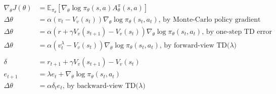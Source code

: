\begin{align*}
    \nabla_\theta J(\theta) & = \mathbb{E}_{{\pi_\theta}}[\nabla_\theta \log \pi_\theta(s, a) A^\pi_\theta(s, a)]                               \\
    \Delta \theta           & = \alpha(v_t - V_v(s_t))\nabla_\theta \log \pi_\theta(s_t, a_t) \text{, by Monte-Carlo policy gradient}           \\
    \Delta \theta           & = \alpha(r + \gamma V_v(s_{t+1}) - V_v(s_t))\nabla_\theta \log \pi_\theta(s_t, a_t) \text{, by one-step TD error} \\
    \Delta \theta           & = \alpha(v_t^\lambda - V_v(s_t))\nabla_\theta \log \pi_\theta(s_t, a_t) \text{, by forward-view TD($\lambda$)}    \\
    \\
    \delta                  & = r_{t+1} + \gamma V_v(s_{t+1}) - V_v(s_t)                                                                        \\
    e_{t+1}                 & = \lambda e_t + \nabla_\theta \log \pi_\theta(s_t, a_t)                                                           \\
    \Delta \theta           & = \alpha \delta_t e_t \text{, by backward-view TD($\lambda$)}
\end{align*}

